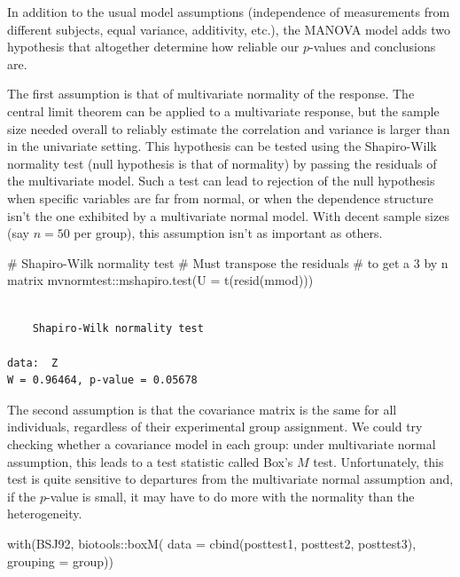 \documentclass[
  11pt,
  letterpaper,
]{scrbook}
\newenvironment{Shaded}{\begin{snugshade}}{\end{snugshade}}
\newcommand{\AttributeTok}[1]{\textcolor[rgb]{0.40,0.45,0.13}{#1}}
\newcommand{\CommentTok}[1]{\textcolor[rgb]{0.37,0.37,0.37}{#1}}
\newcommand{\FunctionTok}[1]{\textcolor[rgb]{0.28,0.35,0.67}{#1}}
\newcommand{\NormalTok}[1]{\textcolor[rgb]{0.00,0.23,0.31}{#1}}
\newcommand{\SpecialCharTok}[1]{\textcolor[rgb]{0.37,0.37,0.37}{#1}}
\theoremstyle{definition}
\theoremstyle{definition}
\theoremstyle{remark}
\begin{document}
In addition to the usual model assumptions (independence of measurements
from different subjects, equal variance, additivity, etc.), the MANOVA
model adds two hypothesis that altogether determine how reliable our
\(p\)-values and conclusions are.

The first assumption is that of multivariate normality of the response.
The central limit theorem can be applied to a multivariate response, but
the sample size needed overall to reliably estimate the correlation and
variance is larger than in the univariate setting. This hypothesis can
be tested using the Shapiro-Wilk normality test (null hypothesis is that
of normality) by passing the residuals of the multivariate model. Such a
test can lead to rejection of the null hypothesis when specific
variables are far from normal, or when the dependence structure isn't
the one exhibited by a multivariate normal model. With decent sample
sizes (say \(n=50\) per group), this assumption isn't as important as
others.

\begin{Shaded}
\begin{Highlighting}[]
\CommentTok{\# Shapiro{-}Wilk normality test}
\CommentTok{\# Must transpose the residuals }
\CommentTok{\# to get a 3 by n matrix}
\NormalTok{mvnormtest}\SpecialCharTok{::}\FunctionTok{mshapiro.test}\NormalTok{(}\AttributeTok{U =} \FunctionTok{t}\NormalTok{(}\FunctionTok{resid}\NormalTok{(mmod)))}
\end{Highlighting}
\end{Shaded}

\begin{verbatim}

    Shapiro-Wilk normality test

data:  Z
W = 0.96464, p-value = 0.05678
\end{verbatim}

The second assumption is that the covariance matrix is the same for all
individuals, regardless of their experimental group assignment. We could
try checking whether a covariance model in each group: under
multivariate normal assumption, this leads to a test statistic called
Box's \(M\) test. Unfortunately, this test is quite sensitive to
departures from the multivariate normal assumption and, if the
\(p\)-value is small, it may have to do more with the normality than the
heterogeneity.

\begin{Shaded}
\begin{Highlighting}[]
\FunctionTok{with}\NormalTok{(BSJ92, }
\NormalTok{     biotools}\SpecialCharTok{::}\FunctionTok{boxM}\NormalTok{(}
       \AttributeTok{data =} \FunctionTok{cbind}\NormalTok{(posttest1, posttest2, posttest3),}
       \AttributeTok{grouping =}\NormalTok{ group))}
\end{Highlighting}
\end{Shaded}
\end{document}
